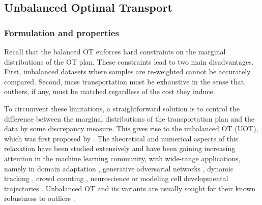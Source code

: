 \subsection{Unbalanced Optimal Transport}

\subsubsection{Formulation and properties}

Recall that the balanced OT enforces hard constraints on the marginal distributions
of the OT plan. These constraints lead to two main disadvantages. First,
imbalanced datasets where samples are re-weighted cannot be accurately compared.
Second, mass transportation must be exhaustive in the sense that,
outliers, if any, must be matched regardless of the cost they induce.

To circumvent these limitations, a straightforward solution is to control
the difference between the marginal distributions of the transportation plan
and the data by some discrepancy measure. This gives rise to the unbalanced OT (UOT),
which was first proposed by \citep{Benamou03}.
The theoretical and numerical aspects of this relaxation
have been studied extensively \citep{Liero18,Chizat18b,Chizat18a,Khiem20}
and have been gaining increasing attention in the machine learning community,
with wide-range applications, namely in domain adaptation \citep{Fatras21},
generative adversarial networks \citep{Balaji20, Yang19}, dynamic tracking \citep{Lee19},
crowd counting \citep{Ma21}, neuroscience \citep{janati2019group, bazeille2019} or
modeling cell developmental trajectories \citep{Schiebinger19}.
Unbalanced OT and its variants are usually sought for
their known robustness to outliers \citep{Mukherjee21,Balaji20,Fatras21,Nietert22,Le21}.

